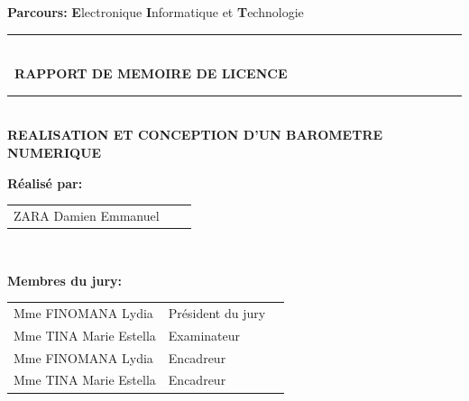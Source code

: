 \documentclass[a4paper,12pt]{report}
\begin{document}
\begin{titlepage}
\begin{center}
\textsc{\Large}
{\large \bfseries Parcours: }
{\large \textbf{E}lectronique \textbf{I}nformatique et \textbf{T}echnologie }\\[1cm]




\rule{\linewidth}{0.2mm} \\[0.4cm]
{ \bfseries\ RAPPORT DE MEMOIRE DE LICENCE \\[0.1cm] }
\rule{\linewidth}{0.2mm} \\[3cm]



\textsc{\huge}
{\huge \bfseries\color{blue} REALISATION ET CONCEPTION D'UN BAROMETRE NUMERIQUE  \\[3cm] }



\begin{minipage}{0.8\textwidth}
  \begin{flushleft} \large
    \begin{center}
    \large \textbf{Réalisé par:}\\
    		\begin{tabular}{l@{\hskip 1cm}l@{\hskip 1cm}l}
				 \textsc{ZARA} Damien Emmanuel    \\
			\end{tabular}\\[1cm]
	\end{center}
	\begin{center}
    \large \textbf{Membres du jury:}\\[2mm]
    		\begin{tabular}{l@{\hskip 1cm}l@{\hskip 1cm}l}
				Mme \textsc{FINOMANA} Lydia   & Président du jury \\
				Mme  \textsc{TINA} Marie Estella & Examinateur\\
				Mme \textsc{FINOMANA} Lydia   & Encadreur \\
				Mme  \textsc{TINA} Marie Estella & Encadreur\\
			\end{tabular}\\[5mm]
    	
    	\end{center}
    
    
    

\end{flushleft}
\end{minipage}
\end{center}
\end{titlepage}
\end{document}
